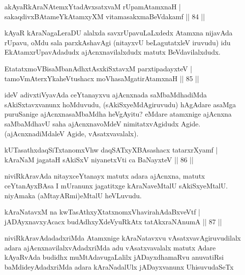 \begin{shl}
akAyaRkAraNAtemxYtadAvxsatxvaM rUpamAtamxnaH |\\
sakaqdivxBAtameYkAtamxyXM vitamasakxmaBeVdakamf \hfill || 84 ||
\end{shl}

\begin{artha}
kAyaR kAraNagaLeraDU alalxda savxrUpavuLaLxdedx Atamxna nijavAda rUpavu, oMdu sala parxkAshavAgi (nitayxvU beLagutatxleV iruvudu) idu EkAtamxrUpavAdadudx ajAcnxnavilalxdudx matutx BeVdavilalxdudx.
\end{artha}


\begin{shl}
EtatatxmoVBisaMbanAdhxtAsxkiSxtavxM parxtipadayxteV |\\
tamoVmAterxYkaheVtushacx moVhasaMgatirAtamxnaH \hfill || 85 ||
\end{shl}

\begin{artha}
ideV adivxtiVyavAda ceYtanayxvu ajAcnxnada saMbaMdhadiMda sAkiSxtavxvanunx hoMduvudu, (sAkiSxyeMdAgiruvudu) hAgAdare asaMga puruSanige ajAcnxnasaMbaMdha heVgAyitu? eMdare atamxnige ajAcnxna saMbaMdhavU saha ajAcnxnavoMdeV nimitatxvAgidudx Agide. (ajAcnxnadiMdaleV Agide, vAsatxvavalalx).
\end{artha}


\begin{shl}
kUTasathxdaqSiTxtanomxVhw daqSATxyXBAsashacx tatarxrXyamf |\\
kAraNaM jagataH sAkiSxV niyanetxVti ca BaNayxteV \hfill || 86 ||
\end{shl}

\begin{artha}
niviRkAravAda nitayxceYtanayx matutx adara ajAcnxna, matutx ceYtanAyxBAsa I mUranunx jagatitxge kAraNaveMtalU sAkiSxyeMtalU. niyAmaka (aMtayARmi)eMtalU heVLuvudu.
\end{artha}

\begin{shl}
kAraNatavxM na kwTasAthxyXtatxnomxVhavirahAdaBxveVtf |\\
jADAyxnavxyAcacx budAdhxyXdeVyuRkAtx tatAkxraNAnumA \hfill || 87 ||
\end{shl}

\begin{artha}
niviRkAravAdadadxriMda Atamxnige kAraNatavxvu vAsatxvavAgiruvudilalx adara ajAcnxnavilalxvAdadxriMda adu vAsatxvavalalx matutx Adare kAyaRvAda budidhx muMtAdavugaLalilx jADayxdhamaRvu anuvatiRsi baMdideyAdadxriMda adara kAraNadalUlx jADayxvanunx UhisuvudaSeTx
\end{artha}	

